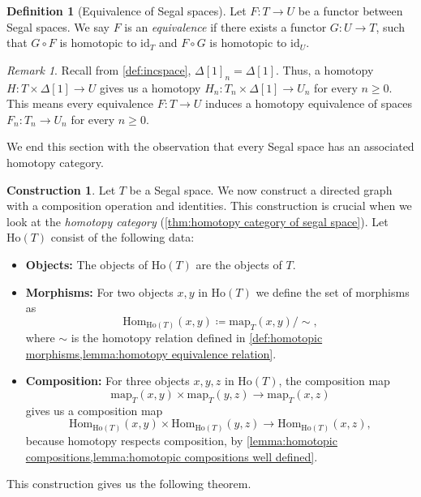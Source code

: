 \documentclass[11pt, a4paper]{amsart}
\newcommand{\Hom}{\mathrm{Hom}}
\newcommand{\map}{\mathrm{map}}
\newcommand{\id}{\mathrm{id}}
\newcommand{\Ho}{\mathrm{Ho}}
\theoremstyle{definition}
\newtheorem{definition}[equation]{Definition}
\newtheorem{construction}[equation]{Construction}
\theoremstyle{remark}
\newtheorem{remark}[equation]{Remark}
\numberwithin{equation}{section}
\begin{document}
\begin{definition}[Equivalence of Segal spaces]
  Let $F\colon T \to U$ be a functor between Segal spaces. We say $F$ is an \emph{equivalence} if there exists a functor $G\colon U \to T$, such that $G \circ F$ is homotopic to $\id_T$ and $F \circ G$ is homotopic to $\id_U$.
\end{definition}

\begin{remark} \label{rem:equivalence to homotopy equivalence}
 Recall from \cref{def:incspace}, $\Delta[1]_n = \Delta[1]$. Thus, a homotopy $H\colon T \times \Delta[1] \to U$ gives us a homotopy $H_n \colon T_n \times \Delta[1] \to U_n$ for every $n \geq 0$. This means every equivalence $F\colon T \to U$ induces a homotopy equivalence of spaces $F_n \colon T_n \to U_n$ for every $n \geq 0$.
\end{remark}

We end this section with the observation that every Segal space has an associated homotopy category.

\begin{construction} \label{constr:homotopy category of segal space}
  Let $T$ be a Segal space. We now construct a directed graph with a composition operation and identities. This construction is crucial when we look at the \emph{homotopy category} (\cref{thm:homotopy category of segal space}). Let $\Ho(T)$ consist of the following data:
  \begin{itemize}[leftmargin=*]
    \item \textbf{Objects:} The objects of $\Ho(T)$ are the objects of $T$.
    \item \textbf{Morphisms:} For two objects $x,y$ in $\Ho(T)$ we define the set of morphisms as
    \[\Hom_{\Ho(T)}(x,y) \coloneq \map_{T}(x,y) / \sim,\]
    where $\sim$ is the homotopy relation defined in \cref{def:homotopic morphisms,lemma:homotopy equivalence relation}.
    \item \textbf{Composition:} For three objects $x,y,z$ in $\Ho(T)$, the composition map 
    \[\map_{T}(x,y) \times \map_{T}(y,z) \to \map_{T}(x,z)\]
    gives us a composition map
    \[ \Hom_{\Ho(T)}(x,y) \times \Hom_{\Ho(T)}(y,z) \to \Hom_{\Ho(T)}(x,z),\]
    because homotopy respects composition, by \cref{lemma:homotopic compositions,lemma:homotopic compositions well defined}.
  \end{itemize}
\end{construction}

This construction gives us the following theorem.
\end{document}
